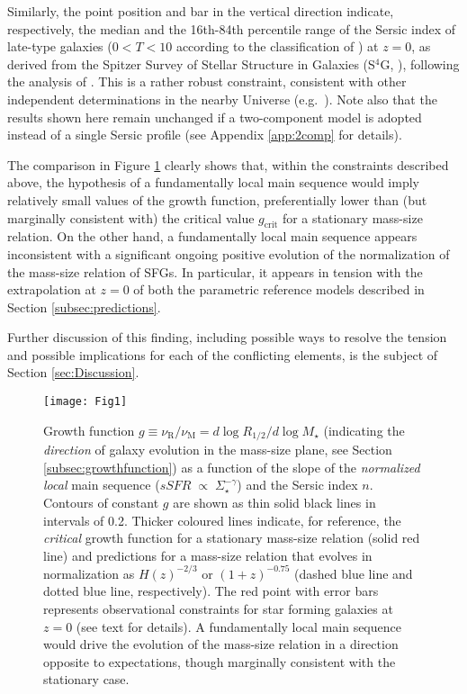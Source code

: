 \documentclass[fleqn,usenatbib]{mnras}
\begin{document}
Similarly, the point position and bar in the vertical direction indicate, respectively, the median and the 16th-84th percentile range of the Sersic index of late-type galaxies ($0 < T < 10$ according to the classification of \citealt{Buta+15}) at $z=0$, as derived from the Spitzer Survey of Stellar Structure in Galaxies (S$^4$G, \citealt{Sheth+10}), following the analysis of \cite{Salo+15}. This is a rather robust constraint, consistent with other independent determinations in the nearby Universe (e.g.\ \citealt{Lange+15}). Note also that the results shown here remain unchanged if a two-component model is adopted instead of a single Sersic profile (see Appendix \ref{app:2comp} for details).

The comparison in Figure \ref{fig:mainresult} clearly shows that, within the constraints described above, the hypothesis of a fundamentally local main sequence would imply relatively small values of the growth function, preferentially lower than (but marginally consistent with) the critical value $g_\textrm{crit}$ for a stationary mass-size relation. On the other hand, a fundamentally local main sequence appears inconsistent with a significant ongoing positive evolution of the normalization of the mass-size relation of SFGs. In particular, it appears in tension with the extrapolation at $z=0$ of both the parametric reference models described in Section \ref{subsec:predictions}.

Further discussion of this finding, including possible ways to resolve the tension and possible implications for each of the conflicting elements, is the subject of Section \ref{sec:Discussion}.

\begin{figure}
\centering
\texttt{[image: Fig1]}
\caption{Growth function $g \equiv \nu_\textrm{R}/ \nu_\textrm{M} = d \log R_{1/2}/d \log M_\star$ (indicating the \emph{direction} of galaxy evolution in the mass-size plane, see Section \ref{subsec:growthfunction}) as a function of the slope of the \emph{normalized local} main sequence ($sSFR \; \propto \;  \Sigma_\star^{-\gamma}$) and the Sersic index $n$. Contours of constant $g$ are shown as thin solid black lines in intervals of 0.2. Thicker coloured lines indicate, for reference, the \emph{critical} growth function for a stationary mass-size relation (solid red line) and predictions for a mass-size relation that evolves in normalization as $H(z)^{-2/3}$ or $(1+z)^{-0.75}$ (dashed blue line and dotted blue line, respectively). The red point with error bars represents observational constraints for star forming galaxies at $z=0$ (see text for details). A fundamentally local main sequence would drive the evolution of the mass-size relation in a direction opposite to expectations, though marginally consistent with the stationary case.}\label{fig:mainresult}
\end{figure}
\end{document}
